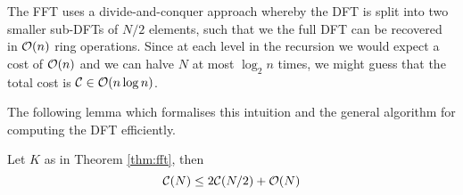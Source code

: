The FFT uses a divide-and-conquer approach whereby the DFT is split into two smaller sub-DFTs of $N/2$ elements, such that we the full DFT can be recovered in $\mathcal O(n)$ ring operations. Since at each level in the recursion we would expect a cost of $\mathcal O(n)$ and we can halve $N$ at most $\log_2 n$ times, we might guess that the total cost is $\mathcal C \in \mathcal O(n \log n)$.

The following lemma which formalises this intuition and the general algorithm for computing the DFT efficiently. 

\begin{lemma}\label{lem:fft-recursion}
    Let $K$ as in Theorem \ref{thm:fft}, then 
    \begin{equation}\label{eq:fftlem}
        \mathcal C(N) \le 2 \mathcal C(N/2) + \mathcal O(N)
    \end{equation}
\end{lemma}

